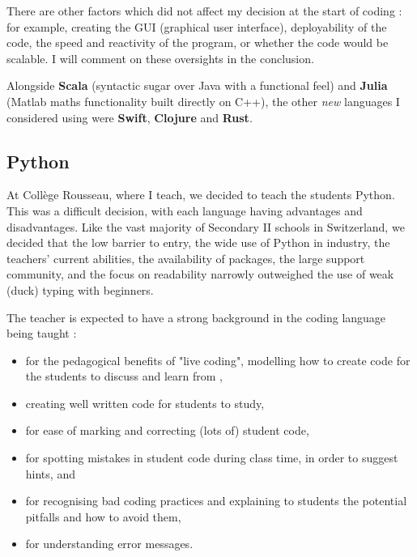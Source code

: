 \documentclass[10pt]{article}
\begin{document}
There are other factors which did not affect my decision at the start of coding : for example, creating the GUI (graphical user interface), deployability of the code, the speed and reactivity of the program, or whether the code would be scalable. I will comment on these oversights in the conclusion.

Alongside \textbf{Scala} (syntactic sugar over Java with a functional feel) and \textbf{Julia} (Matlab maths functionality built directly on C++), the other \emph{new} languages I considered using were \textbf{Swift}, \textbf{Clojure} and \textbf{Rust}.

\subsection{Python} \label{python}
At Collège Rousseau, where I teach, we decided to teach the students Python. This was a difficult decision, with each language having advantages and disadvantages. Like the vast majority of Secondary II schools in Switzerland, we decided that the low barrier to entry, the wide use of Python in industry, the teachers' current abilities, the availability of packages, the large support community, and the focus on readability narrowly outweighed the use of weak (duck) typing with beginners.

The teacher is expected to have a strong background in the coding language being taught :
\begin{itemize}
\item for the pedagogical benefits of "live coding", modelling how to create code for the students to discuss and learn from \cite{Raj2018}, 
\item creating well written code for students to study,
\item for ease of marking and correcting (lots of) student code,
\item for spotting mistakes in student code during class time, in order to suggest hints, and
\item for recognising bad coding practices and explaining to students the potential pitfalls and how to avoid them,
\item for understanding error messages.
\end{itemize}
\end{document}
